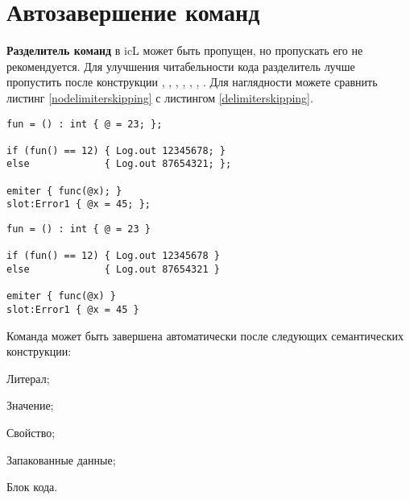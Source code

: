 \section{Автозавершение команд}

\textbf{Разделитель команд} в icL может быть пропущен, но пропускать его не рекомендуется. Для улучшения читабельности кода разделитель лучше пропустить после конструкции , , , , , , . Для наглядности можете сравнить листинг \ref{nodelimiterskipping} с листингом \ref{delimiterskipping}.

\begin{lstlisting}[caption=Без пропущенных разделители, label=nodelimiterskipping]
fun = () : int { @ = 23; };

if (fun() == 12) { Log.out 12345678; } 
else             { Log.out 87654321; };

emiter { func(@x); }
slot:Error1 { @x = 45; };
\end{lstlisting}

\begin{lstlisting}[caption=С пропущенными разделителями, label=delimiterskipping]
fun = () : int { @ = 23 }

if (fun() == 12) { Log.out 12345678 } 
else             { Log.out 87654321 }

emiter { func(@x) }
slot:Error1 { @x = 45 }
\end{lstlisting}

Команда может быть завершена автоматически после следующих семантических конструкции:
\begin{icItems}
	\item Литерал;
	\item Значение;
	\item Свойство;
	\item Запакованные данные;
	\item Блок кода.
\end{icItems}